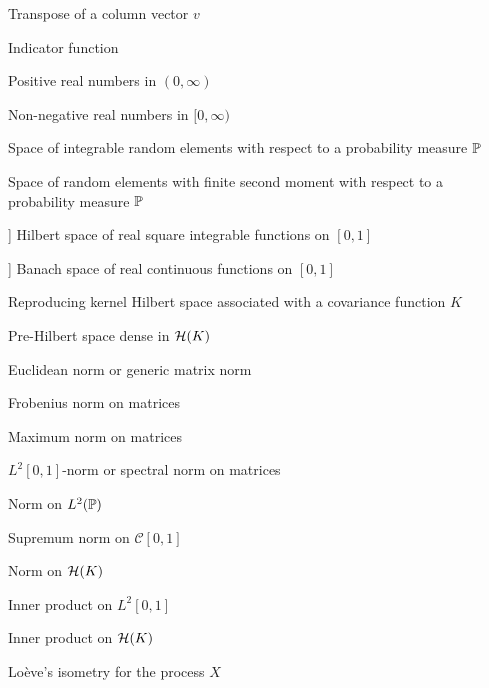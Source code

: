     \begingroup
    \renewcommand{\descriptionlabel}[1]{\hspace*{\labelsep}\slsc{#1}}
    \begin{symbolsdesc}[labelwidth=6em, leftmargin=6em, style=nextline, itemsep=1pt]
        \item [\(v'\)] Transpose of a column vector \(v\)
        \item [\(\mathds{1}\)] Indicator function
        \item [\(\R^+\)] Positive real numbers in \((0, \infty)\)
        \item [\(\R^+_0\)] Non-negative real numbers in \([0, \infty)\)
        \item [\(L^1(\pp)\)] Space of integrable random elements with respect to a probability measure \(\mathbb{P}\)
        \item [\(L^2(\pp)\)] Space of random elements with finite second moment with respect to a probability measure \(\mathbb{P}\)
       \item[\(L^2[0,1]\)] Hilbert space of real square integrable functions on \([0,1]\)
        \item[\(\mathcal C[0,1]\)] Banach space of real continuous functions on \([0,1]\)
        \item [\(\Hcal(K)\)] Reproducing kernel Hilbert space associated with a covariance function \(K\)
        \item [\(\Hcal_0(K)\)] Pre-Hilbert space dense in \(\Hcal(K)\)
        \item [\(\|\cdot\|\)] Euclidean norm or generic matrix norm
        \item [\(\|\cdot\|_F\)] Frobenius norm on matrices
        \item [\(\|\cdot\|_{\max}\)] Maximum norm on matrices
        \item [\(\|\cdot\|_2\)] \(L^2[0,1]\)-norm or spectral norm on matrices
        \item [\(\|\cdot\|_{2,\pp}\)] Norm on \(L^2(\pp)\)
        \item [\(\|\cdot\|_\infty\)] Supremum norm on \(\mathcal C[0,1]\)
        \item [\(\|\cdot\|_K\)] Norm on \(\Hcal(K)\)
        \item [\(\dotprod{\cdot}{\cdot}_2\)] Inner product on \(L^2[0,1]\)
        \item [\(\dotprod{\cdot}{\cdot}_K\)] Inner product on \(\Hcal(K)\)
        \item [\(\Psi_X\)] Loève's isometry for the process \(X\)

\end{symbolsdesc}

